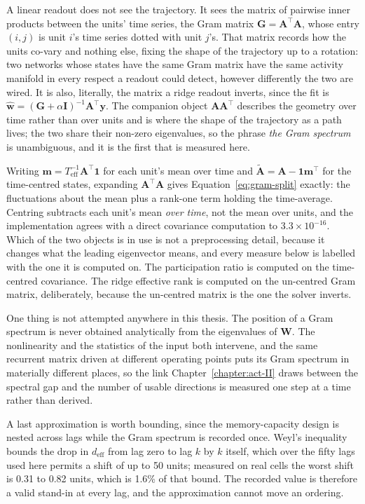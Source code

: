 A linear readout does not see the trajectory. It sees the matrix of pairwise
inner products between the units' time series, the Gram matrix $\mathbf{G} = \mathbf{A}^{\top}\mathbf{A}$,
whose entry $(i,j)$ is unit $i$'s time series dotted with unit $j$'s. That matrix
records how the units co-vary and nothing else, fixing the shape of the
trajectory up to a rotation: two networks whose states have the same Gram matrix
have the same activity manifold in every respect a readout could detect, however
differently the two are wired. It is also, literally, the matrix a ridge readout
inverts, since the fit is
$\hat{\mathbf{w}} = (\mathbf{G} + \alpha \mathbf{I})^{-1}\mathbf{A}^{\top}\mathbf{y}$. The companion object $\mathbf{A}\mathbf{A}^{\top}$
describes the geometry over time rather than over units and is where the shape of
the trajectory as a path lives; the two share their non-zero eigenvalues, so the
phrase \emph{the Gram spectrum} is unambiguous, and it is the first that is
measured here.

Writing $\mathbf{m} = T_{\mathrm{eff}}^{-1}\mathbf{A}^{\top}\mathbf{1}$ for each unit's mean over
time and $\tilde{\mathbf{A}} = \mathbf{A} - \mathbf{1}\mathbf{m}^{\top}$ for the time-centred states,
expanding $\mathbf{A}^{\top}\mathbf{A}$ gives Equation~\ref{eq:gram-split} exactly: the
fluctuations about the mean plus a rank-one term holding the time-average.
Centring subtracts each unit's mean \emph{over time}, not the mean over units,
and the implementation agrees with a direct covariance computation to
$3.3 \times 10^{-16}$. %
Which of the two objects is in use is not a preprocessing detail, because it
changes what the leading eigenvector means, and every measure below is labelled
with the one it is computed on. The participation ratio is computed on the
time-centred covariance. The ridge effective rank is computed on the un-centred
Gram matrix, deliberately, because the un-centred matrix is the one the solver
inverts.

One thing is not attempted anywhere in this thesis. The position of a Gram
spectrum is never obtained analytically from the eigenvalues of $\mathbf{W}$. The
nonlinearity and the statistics of the input both intervene, and the same
recurrent matrix driven at different operating points puts its Gram spectrum in
materially different places, so the link Chapter~\ref{chapter:act-II} draws
between the spectral gap and the number of usable directions is measured one step
at a time rather than derived.

A last approximation is worth bounding, since the memory-capacity design is
nested across lags while the Gram spectrum is recorded once. Weyl's inequality
bounds the drop in $d_{\mathrm{eff}}$ from lag zero to lag $k$ by $k$ itself,
which over the fifty lags used here permits a shift of up to
50 units; %
measured on real cells the worst shift is
0.31 to 0.82 units, %
which is 1.6\% %
of that bound. The recorded value is therefore a valid stand-in at every lag, and
the approximation cannot move an ordering.


